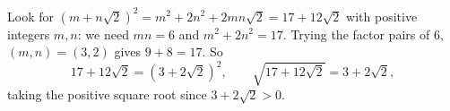 Look for $\left(m+n\sqrt2\right)^2=m^2+2n^2+2mn\sqrt2=17+12\sqrt2$ with positive integers $m,n$: we need $mn=6$ and $m^2+2n^2=17$. Trying the factor pairs of $6$, $(m,n)=(3,2)$ gives $9+8=17$. So
\[
17+12\sqrt2=\left(3+2\sqrt2\right)^2,\qquad \sqrt{17+12\sqrt2}=\boxed{3+2\sqrt2},
\]
taking the positive square root since $3+2\sqrt2>0$.
